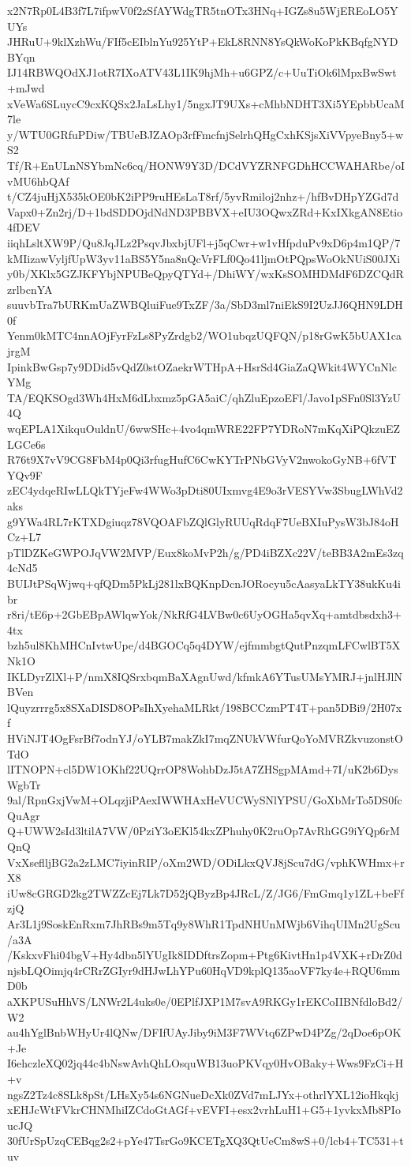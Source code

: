 x2N7Rp0L4B3f7L7ifpwV0f2zSfAYWdgTR5tnOTx3HNq+IGZs8u5WjEREoLO5YUYs
JHRuU+9klXzhWu/FIf5cEIblnYu925YtP+EkL8RNN8YsQkWoKoPkKBqfgNYDBYqn
IJ14RBWQOdXJ1otR7IXoATV43L1IK9hjMh+u6GPZ/c+UuTiOk6lMpxBwSwt+mJwd
xVeWa6SLuycC9cxKQSx2JaLsLhy1/5ngxJT9UXs+cMhbNDHT3Xi5YEpbbUcaM7le
y/WTU0GRfuPDiw/TBUeBJZAOp3rfFmcfnjSelrhQHgCxhKSjsXiVVpyeBny5+wS2
Tf/R+EnULnNSYbmNc6cq/HONW9Y3D/DCdVYZRNFGDhHCCWAHARbe/oIvMU6hbQAf
t/CZ4juHjX535kOE0bK2iPP9ruHEsLaT8rf/5yvRmiloj2nhz+/hfBvDHpYZGd7d
Vapx0+Zn2rj/D+1bdSDDOjdNdND3PBBVX+eIU3OQwxZRd+KxIXkgAN8Etio4fDEV
iiqhLsltXW9P/Qu8JqJLz2PsqvJbxbjUFl+j5qCwr+w1vHfpduPv9xD6p4m1QP/7
kMIizawVyljfUpW3yv11aBS5Y5na8nQcVrFLf0Qo41ljmOtPQpsWoOkNUiS00JXi
y0b/XKlx5GZJKFYbjNPUBeQpyQTYd+/DhiWY/wxKsSOMHDMdF6DZCQdRzrlbcnYA
suuvbTra7bURKmUaZWBQluiFue9TxZF/3a/SbD3ml7niEkS9I2UzJJ6QHN9LDH0f
Yenm0kMTC4nnAOjFyrFzLs8PyZrdgb2/WO1ubqzUQFQN/p18rGwK5bUAX1cajrgM
IpinkBwGsp7y9DDid5vQdZ0stOZaekrWTHpA+HsrSd4GiaZaQWkit4WYCnNlcYMg
TA/EQKSOgd3Wh4HxM6dLbxmz5pGA5aiC/qhZluEpzoEFl/Javo1pSFn0Sl3YzU4Q
wqEPLA1XikquOuldnU/6wwSHc+4vo4qmWRE22FP7YDRoN7mKqXiPQkzuEZLGCe6s
R76t9X7vV9CG8FbM4p0Qi3rfugHufC6CwKYTrPNbGVyV2nwokoGyNB+6fVTYQv9F
zEC4ydqeRIwLLQkTYjeFw4WWo3pDti80UIxmvg4E9o3rVESYVw3SbugLWhVd2aks
g9YWa4RL7rKTXDgiuqz78VQOAFbZQlGlyRUUqRdqF7UeBXIuPysW3bJ84oHCz+L7
pTlDZKeGWPOJqVW2MVP/Eux8koMvP2h/g/PD4iBZXc22V/teBB3A2mEs3zq4cNd5
BUIJtPSqWjwq+qfQDm5PkLj281lxBQKnpDcnJORocyu5cAasyaLkTY38ukKu4ibr
r8ri/tE6p+2GbEBpAWlqwYok/NkRfG4LVBw0c6UyOGHa5qvXq+amtdbsdxh3+4tx
bzh5ul8KhMHCnIvtwUpe/d4BGOCq5q4DYW/ejfmmbgtQutPnzqmLFCwlBT5XNk1O
IKLDyrZlXl+P/nmX8IQSrxbqmBaXAgnUwd/kfmkA6YTusUMsYMRJ+jnlHJlNBVen
lQuyzrrrg5x8SXaDISD8OPsIhXyehaMLRkt/198BCCzmPT4T+pan5DBi9/2H07xf
HViNJT4OgFsrBf7odnYJ/oYLB7makZkI7mqZNUkVWfurQoYoMVRZkvuzonstOTdO
lITNOPN+cl5DW1OKhf22UQrrOP8WohbDzJ5tA7ZHSgpMAmd+7I/uK2b6DysWgbTr
9al/RpnGxjVwM+OLqzjiPAexIWWHAxHeVUCWySNlYPSU/GoXbMrTo5DS0fcQuAgr
Q+UWW2sId3ltilA7VW/0PziY3oEKl54kxZPhuhy0K2ruOp7AvRhGG9iYQp6rMQnQ
VxXseflljBG2a2zLMC7iyinRIP/oXm2WD/ODiLkxQVJ8jScu7dG/vphKWHmx+rX8
iUw8cGRGD2kg2TWZZcEj7Lk7D52jQByzBp4JRcL/Z/JG6/FmGmq1y1ZL+beFfzjQ
Ar3L1j9SoskEnRxm7JhRBs9m5Tq9y8WhR1TpdNHUnMWjb6VihqUIMn2UgScu/a3A
/KskxvFhi04bgV+Hy4dbn5lYUgIk8IDDftrsZopm+Ptg6KivtHn1p4VXK+rDrZ0d
njsbLQOimjq4rCRrZGIyr9dHJwLhYPu60HqVD9kplQ135aoVF7ky4e+RQU6mmD0b
aXKPUSuHhVS/LNWr2L4uks0e/0EPlfJXP1M7svA9RKGy1rEKCoIIBNfdloBd2/W2
au4hYglBnbWHyUr4lQNw/DFIfUAyJiby9iM3F7WVtq6ZPwD4PZg/2qDoe6pOK+Je
I6ehczleXQ02jq44c4bNswAvhQhLOsquWB13uoPKVqy0HvOBaky+Wws9FzCi+H+v
ngsZ2Tz4c8SLk8pSt/LHsXy54s6NGNueDcXk0ZVd7mLJYx+othrlYXL12ioHkqkj
xEHJcWtFVkrCHNMhiIZCdoGtAGf+vEVFI+esx2vrhLuH1+G5+1yvkxMb8PIoucJQ
30fUrSpUzqCEBqg2s2+pYe47TsrGo9KCETgXQ3QtUeCm8wS+0/lcb4+TC531+tuv
